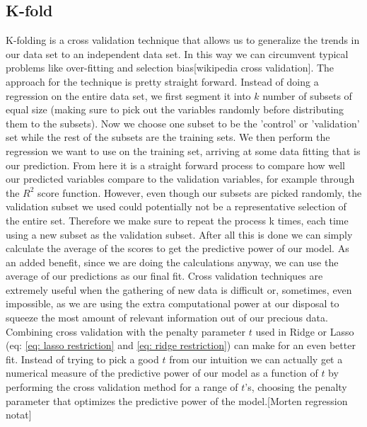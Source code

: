 \subsection{K-fold}
K-folding is a cross validation technique that allows us to generalize the trends in our data set to an independent data set. In this way we can circumvent typical problems like over-fitting and selection bias[wikipedia cross validation]. The approach for the technique is pretty straight forward. Instead of doing a regression on the entire data set, we first segment it into $k$ number of subsets of equal size (making sure to pick out the variables randomly before distributing them to the subsets). Now we choose one subset to be the 'control' or 'validation' set while the rest of the subsets are the training sets. We then perform the regression we want to use on the training set, arriving at some data fitting that is our prediction. From here it is a straight forward process to compare how well our predicted variables compare to the validation variables, for example through the $R^2$ score function. However, even though our subsets are picked randomly, the validation subset we used could potentially not be a representative selection of the entire set. Therefore we make sure to repeat the process k times, each time using a new subset as the validation subset. After all this is done we can simply calculate the average of the scores to get the predictive power of our model. As an added benefit, since we are doing the calculations anyway, we can use the average of our predictions as our final fit. Cross validation techniques are extremely useful when the gathering of new data is difficult or, sometimes, even impossible, as we are using the extra computational power at our disposal to squeeze the most amount of relevant information out of our precious data.\\
Combining cross validation with the penalty parameter $t$ used in Ridge or Lasso (eq: \ref{eq: lasso restriction} and \ref{eq: ridge restriction}) can make for an even better fit.
Instead of trying to pick a good $t$ from our intuition we can actually get a numerical measure of the predictive power of our model as a function of $t$ by performing the cross validation method for a range of $t$'s, choosing the penalty parameter that optimizes the predictive power of the model.[Morten regression notat]
